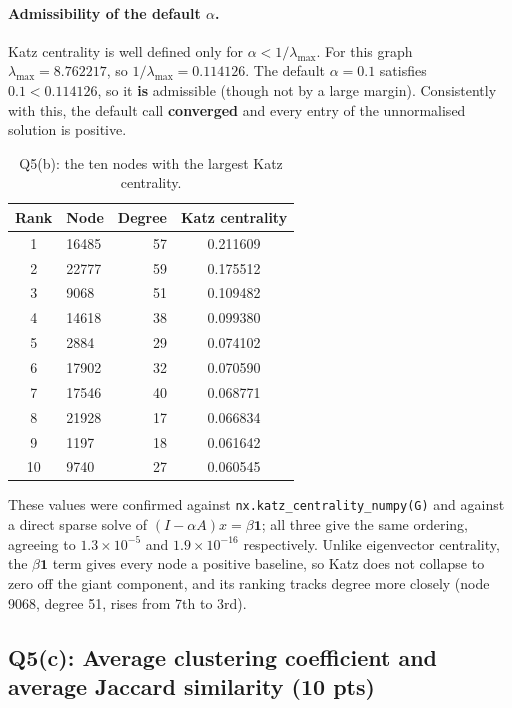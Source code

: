 \paragraph{Admissibility of the default $\alpha$.}
Katz centrality is well defined only for $\alpha<1/\lambda_{\max}$. For this graph
$\lambda_{\max}=8.762217$, so $1/\lambda_{\max}=0.114126$. The default
$\alpha=0.1$ satisfies $0.1<0.114126$, so it \textbf{is} admissible (though not by
a large margin). Consistently with this, the default call \textbf{converged} and
every entry of the unnormalised solution is positive.

\begin{table}[H]
\centering
\begin{tabular}{clrc}
\toprule
Rank & Node & Degree & Katz centrality \\
\midrule
1  & 16485 & 57 & 0.211609 \\
2  & 22777 & 59 & 0.175512 \\
3  & 9068  & 51 & 0.109482 \\
4  & 14618 & 38 & 0.099380 \\
5  & 2884  & 29 & 0.074102 \\
6  & 17902 & 32 & 0.070590 \\
7  & 17546 & 40 & 0.068771 \\
8  & 21928 & 17 & 0.066834 \\
9  & 1197  & 18 & 0.061642 \\
10 & 9740  & 27 & 0.060545 \\
\bottomrule
\end{tabular}
\caption{Q5(b): the ten nodes with the largest Katz centrality.}
\label{p3:tab:katz}
\end{table}

These values were confirmed against \texttt{nx.katz\_centrality\_numpy(G)} and
against a direct sparse solve of $(I-\alpha A)x=\beta\mathbf{1}$; all three give
the same ordering, agreeing to $1.3\times10^{-5}$ and $1.9\times10^{-16}$
respectively. Unlike eigenvector centrality, the $\beta\mathbf{1}$ term gives every
node a positive baseline, so Katz does not collapse to zero off the giant
component, and its ranking tracks degree more closely (node 9068, degree 51, rises
from 7th to 3rd).

\subsection*{Q5(c): Average clustering coefficient and average Jaccard similarity (10 pts)}

